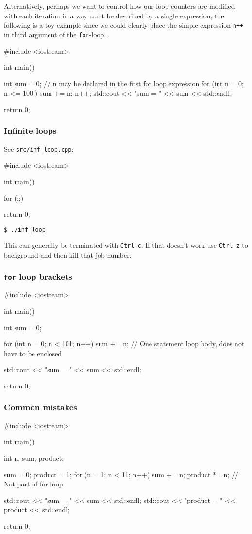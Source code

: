 \documentclass[12pt,letterpaper,twoside]{article}
\begin{document}
Alternatively, perhaps we want to control how our loop counters are
modified with each iteration in a way can't be described by a single
expression; the following is a toy example since we could clearly
place the simple expression \texttt{n++} in third argument of the \texttt{for}-loop.
\begin{cpp}
#include <iostream>

int main() {
  int sum = 0;
  // n may be declared in the first for loop expression
  for (int n = 0; n <= 100;) {
    sum += n;
    n++;
  }
  std::cout << "sum = " << sum << std::endl;

  return 0;
}
\end{cpp}

\subsubsection{Infinite loops}
See \texttt{src/inf\_loop.cpp}:

\begin{cpp}
#include <iostream>

int main() {
  for (;;) {
  }

  return 0;
}
\end{cpp}

\begin{verbatim}
$ ./inf_loop
\end{verbatim}
This can generally be terminated with \texttt{Ctrl-c}.
If that doesn't work use \texttt{Ctrl-z} to background and then kill
that job number.

\subsubsection{\texorpdfstring{\texttt{for} loop brackets}{for loop brackets}}
\begin{cpp}
#include <iostream>

int main() {
  int sum = 0;

  for (int n = 0; n < 101; n++)
    sum += n; // One statement loop body, does not have to be enclosed

  std::cout << "sum = " << sum << std::endl;

  return 0;
}
\end{cpp}

\subsubsection{Common mistakes}
\begin{cpp}
#include <iostream>

int main() {
  int n, sum, product;

  sum = 0;
  product = 1;
  for (n = 1; n < 11; n++)
    sum += n;
    product *= n; // Not part of for loop


  std::cout << "sum = " << sum << std::endl;
  std::cout << "product = " << product << std::endl;

  return 0;
}
\end{cpp}
\end{document}
